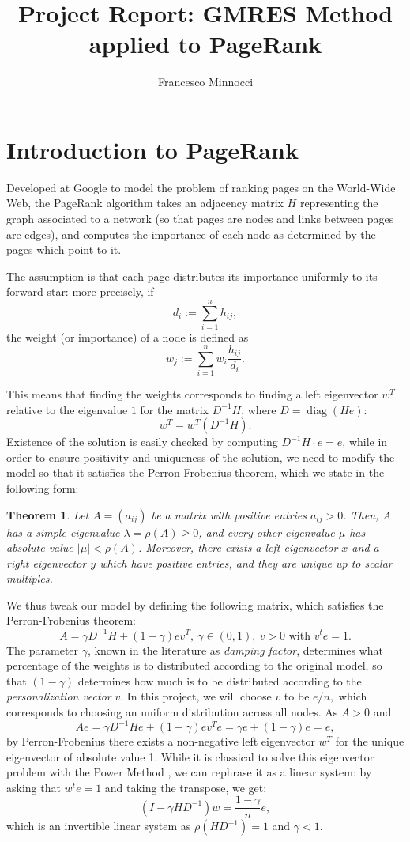 \documentclass[a4paper]{article}
\title{Project Report: GMRES Method applied to PageRank}
\author{Francesco Minnocci}
\newtheorem{theorem}{Theorem}[section]
\theoremstyle{definition}
\theoremstyle{definition}
\theoremstyle{remark}
\theoremstyle{definition}
\begin{document}
\maketitle
\section{Introduction to PageRank}
Developed at Google to model the problem of ranking pages on the World-Wide Web, the PageRank algorithm takes an adjacency matrix $H$ representing the graph associated to a
network (so that pages are nodes and links between pages are edges), and computes the
importance of each node as determined by the pages which point to it.

The assumption is that each page distributes its importance uniformly to its forward star: more precisely, if
 $$ d_i:=\sum_{i=1}^{n} h_{ij} ,$$
 the weight (or importance) of a node is defined as $$ w_j:=\sum_{i=1}^{n} w_i \frac{h_{ij}}{d_i} .$$

 This means that finding the weights corresponds to finding a left eigenvector $w^T$ relative to the eigenvalue $1$ for the matrix $D^{-1}H$, where $D=\operatorname{diag}(He)$: $$ w^T=w^T\left( D^{-1}H \right)
 .$$
 Existence of the solution is easily checked by computing $D^{-1}H\cdot e=e$, while in order to ensure positivity and uniqueness of the solution, we need to modify the model so
 that it satisfies the Perron-Frobenius theorem, which we state in the following form:
 \begin{theorem}
	 Let $A=(a_{ij})$ be a matrix with positive entries $a_{ij}>0$. Then, $A$ has a simple eigenvalue $\lambda=\rho(A)\geq 0$, and every other eigenvalue $\mu$ has absolute
	 value
	 $|\mu|<\rho(A)$. Moreover, there exists a left eigenvector $x$ and a right eigenvector $y$ which have positive entries, and they are unique up to scalar multiples.
 \end{theorem}
 We thus tweak our model by defining the following matrix, which satisfies the Perron-Frobenius theorem:
 $$ A=\gamma D^{-1}H+(1-\gamma)ev^T,~\gamma\in\left( 0,1 \right) ,\:v>0\text{ with }v^t e=1 .$$
 The parameter $\gamma$, known in the literature as \textit{damping factor}, determines what percentage of the weights is to distributed according to the original model, so
 that $(1-\gamma)$ determines
 how much is to be distributed according to the \textit{personalization vector} $v$. In this project, we will choose $v$ to be $e/n,$ which corresponds to choosing an uniform
 distribution across all nodes.
 As $A>0$ and $$Ae=\gamma D^{-1}He+(1-\gamma)ev^Te=\gamma e+(1-\gamma)e=e,$$ by Perron-Frobenius there exists a non-negative left eigenvector $w^T$ for the unique eigenvector of
 absolute value 1.
 While it is classical to solve this eigenvector problem with the Power Method \cite{bini}, we can rephrase it as a linear system: by asking that $w^t e=1$ and taking the
 transpose, we get:
 \begin{equation}\label{eq:linsys} (I-\gamma HD^{-1})w=\frac{1-\gamma}{n}e ,\end{equation}
 which is an invertible linear system as $\rho(HD^{-1})=1$ and $\gamma<1$.
\end{document}
